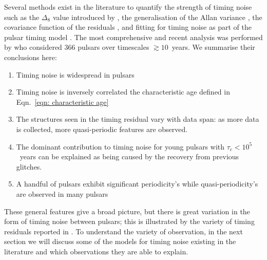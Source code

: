 Several methods exist in the literature to quantify the strength of timing
noise such as the $\Delta_{8}$ value introduced by \citet{Arzoumanian1994}, the
generalisation of the Allan variance \citep{Matsakis1997}, the covariance
function of the residuals \citep{Coles2011}, and fitting for timing noise as
part of the pulsar timing model \citep{Lentati2014}.  The most comprehensive
and recent analysis was performed by \citet{Hobbs2010} who considered 366
pulsars over timescales $\gtrsim10$~years.  We summarise their conclusions
here: \begin{enumerate}

    \item Timing noise is widespread in pulsars

    \item Timing noise is inversely correlated the characteristic age defined
in Eqn.~\ref{eqn: characteristic age}

    \item The structures seen in the timing residual vary with data span: as
more data is collected, more quasi-periodic features are observed.

    \item The dominant contribution to timing noise for young pulsars with
$\tau_{c}<10^{5}$~years can be explained as being caused by the recovery from
previous glitches.

    \item A handful of pulsars exhibit significant periodicity's while
quasi-periodicity's are observed in many pulsars

\end{enumerate}

These general features give a broad picture, but there is great variation in
the form of timing noise between pulsars; this is illustrated by the variety of
timing residuals reported in \citet{Hobbs2010}. To understand the variety of
observation, in the next section we will discuss some of the models for timing
noise existing in the literature and which observations they are able to
explain.
